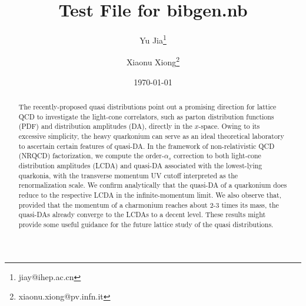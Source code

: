 \documentclass[english,preprint,aps,prd,showpacs,superscriptaddress,nofootinbib,tightenlines]{revtex4}
\begin{document}
\title{Test File for bibgen.nb}

\author{Yu Jia\footnote{jiay@ihep.ac.cn}}

\author{Xiaonu Xiong\footnote{xiaonu.xiong@pv.infn.it}}



\date{\today}

\begin{abstract}
The recently-proposed quasi distributions point out a promising direction
for lattice QCD to investigate the light-cone correlators,
such as parton distribution functions (PDF) and distribution amplitudes (DA),
directly in the $x$-space.
Owing to its excessive simplicity,
the heavy quarkonium can serve as an ideal theoretical laboratory to ascertain
certain features of quasi-DA.
In the framework of non-relativistic QCD (NRQCD) factorization, we compute the order-$\alpha_s$ correction to
both light-cone distribution amplitudes (LCDA) and quasi-DA associated with the lowest-lying quarkonia,
with the transverse momentum UV cutoff interpreted as the renormalization scale.
We confirm analytically that the quasi-DA of a quarkonium does reduce to
the respective LCDA in the infinite-momentum limit.
We also observe that, provided that the momentum of a charmonium reaches about
2-3 times its mass, the quasi-DAs already converge to the LCDAs to a decent level.
These results might provide some useful guidance for the future
lattice study of the quasi distributions.
\end{abstract}


\end{document}
